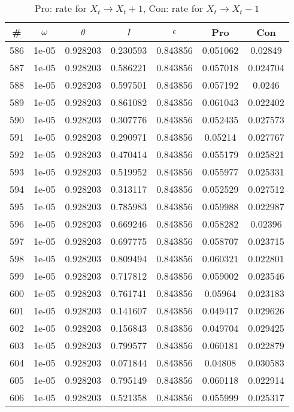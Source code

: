 \newpage
\begin{table}
\caption{Pro: rate for $X_t \rightarrow X_t + 1$, Con: rate for $X_t \rightarrow X_t - 1$}
\begin{tabular*}{\linewidth}{c|c|c|c|c|c|c}
\# & $\omega$ & $\theta$ & $I$ & $\epsilon$ & Pro & Con \\
\hline
586 & 1e-05 & 0.928203 & 0.230593 & 0.843856 & 0.051062 & 0.02849\\
587 & 1e-05 & 0.928203 & 0.586221 & 0.843856 & 0.057018 & 0.024704\\
588 & 1e-05 & 0.928203 & 0.597501 & 0.843856 & 0.057192 & 0.0246\\
589 & 1e-05 & 0.928203 & 0.861082 & 0.843856 & 0.061043 & 0.022402\\
590 & 1e-05 & 0.928203 & 0.307776 & 0.843856 & 0.052435 & 0.027573\\
591 & 1e-05 & 0.928203 & 0.290971 & 0.843856 & 0.05214 & 0.027767\\
592 & 1e-05 & 0.928203 & 0.470414 & 0.843856 & 0.055179 & 0.025821\\
593 & 1e-05 & 0.928203 & 0.519952 & 0.843856 & 0.055977 & 0.025331\\
594 & 1e-05 & 0.928203 & 0.313117 & 0.843856 & 0.052529 & 0.027512\\
595 & 1e-05 & 0.928203 & 0.785983 & 0.843856 & 0.059988 & 0.022987\\
596 & 1e-05 & 0.928203 & 0.669246 & 0.843856 & 0.058282 & 0.02396\\
597 & 1e-05 & 0.928203 & 0.697775 & 0.843856 & 0.058707 & 0.023715\\
598 & 1e-05 & 0.928203 & 0.809494 & 0.843856 & 0.060321 & 0.022801\\
599 & 1e-05 & 0.928203 & 0.717812 & 0.843856 & 0.059002 & 0.023546\\
600 & 1e-05 & 0.928203 & 0.761741 & 0.843856 & 0.05964 & 0.023183\\
601 & 1e-05 & 0.928203 & 0.141607 & 0.843856 & 0.049417 & 0.029626\\
602 & 1e-05 & 0.928203 & 0.156843 & 0.843856 & 0.049704 & 0.029425\\
603 & 1e-05 & 0.928203 & 0.799577 & 0.843856 & 0.060181 & 0.022879\\
604 & 1e-05 & 0.928203 & 0.071844 & 0.843856 & 0.04808 & 0.030583\\
605 & 1e-05 & 0.928203 & 0.795149 & 0.843856 & 0.060118 & 0.022914\\
606 & 1e-05 & 0.928203 & 0.521358 & 0.843856 & 0.055999 & 0.025317\\

\end{tabular*}
\end{table}
